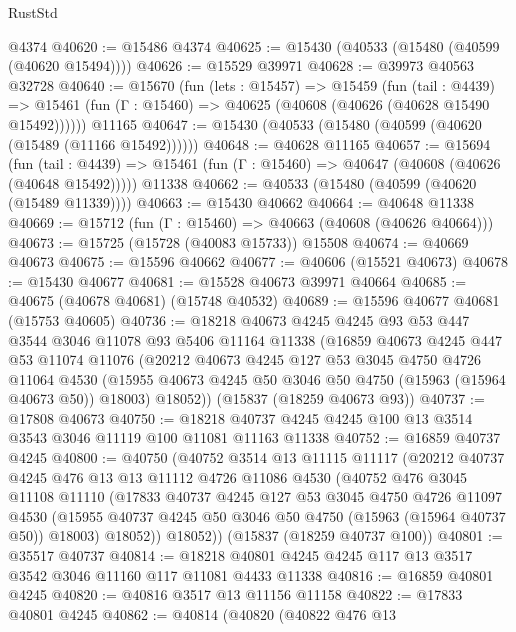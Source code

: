 \begin{lexlean}{RustStd}
\begin{coremodule}
{\begin{coremodule}
{{{{{{{{{{{{{{{{{{{{{{{{{{{{{{{{{{{{{{{{{{{{{{{{{{{{{{{{{{{{    @4374
@40620 := @15486 @4374
@40625 := @15430 (@40533 (@15480 (@40599 (@40620 @15494))))
@40626 := @15529 @39971
@40628 := @39973 @40563 @32728
@40640 := @15670
    (fun (lets : @15457) =>
    @15459
      (fun (tail : @4439) =>
      @15461 (fun (Γ : @15460) => @40625 (@40608 (@40626 (@40628 @15490 @15492))))))
    @11165
@40647 := @15430 (@40533 (@15480 (@40599 (@40620 (@15489 (@11166 @15492))))))
@40648 := @40628 @11165
@40657 := @15694
    (fun (tail : @4439) => @15461 (fun (Γ : @15460) => @40647 (@40608 (@40626 (@40648 @15492)))))
    @11338
@40662 := @40533 (@15480 (@40599 (@40620 (@15489 @11339))))
@40663 := @15430 @40662
@40664 := @40648 @11338
@40669 := @15712 (fun (Γ : @15460) => @40663 (@40608 (@40626 @40664)))
@40673 := @15725 (@15728 (@40083 @15733)) @15508
@40674 := @40669 @40673
@40675 := @15596 @40662
@40677 := @40606 (@15521 @40673)
@40678 := @15430 @40677
@40681 := @15528 @40673 @39971 @40664
@40685 := @40675 (@40678 @40681) (@15748 @40532)
@40689 := @15596 @40677 @40681 (@15753 @40605)
@40736 := @18218
    @40673
    @4245
    @4245
    @93
    @53
    @447
    @3544
    @3046
    @11078
    @93
    @5406
    @11164
    @11338
    (@16859
      @40673
      @4245
      @447
      @53
      @11074
      @11076
      (@20212
        @40673
        @4245
        @127
        @53
        @3045
        @4750
        @4726
        @11064
        @4530
        (@15955 @40673 @4245 @50 @3046 @50 @4750 (@15963 (@15964 @40673 @50)) @18003)
        @18052))
    (@15837 (@18259 @40673 @93))
@40737 := @17808 @40673
@40750 := @18218 @40737 @4245 @4245 @100 @13 @3514 @3543 @3046 @11119 @100 @11081 @11163 @11338
@40752 := @16859 @40737 @4245
@40800 := @40750
    (@40752
      @3514
      @13
      @11115
      @11117
      (@20212
        @40737
        @4245
        @476
        @13
        @13
        @11112
        @4726
        @11086
        @4530
        (@40752
          @476
          @3045
          @11108
          @11110
          (@17833
            @40737
            @4245
            @127
            @53
            @3045
            @4750
            @4726
            @11097
            @4530
            (@15955 @40737 @4245 @50 @3046 @50 @4750 (@15963 (@15964 @40737 @50)) @18003)
            @18052))
        @18052))
    (@15837 (@18259 @40737 @100))
@40801 := @35517 @40737
@40814 := @18218 @40801 @4245 @4245 @117 @13 @3517 @3542 @3046 @11160 @117 @11081 @4433 @11338
@40816 := @16859 @40801 @4245
@40820 := @40816 @3517 @13 @11156 @11158
@40822 := @17833 @40801 @4245
@40862 := @40814
    (@40820
      (@40822
        @476
        @13
}}}}}}}}}}}}}}}}}}}}}}}}}}}}}}}}}}}}}}}}}}}}}}}}}}}}}}}}}}}}
\end{coremodule}}
\end{coremodule}
\end{lexlean}
